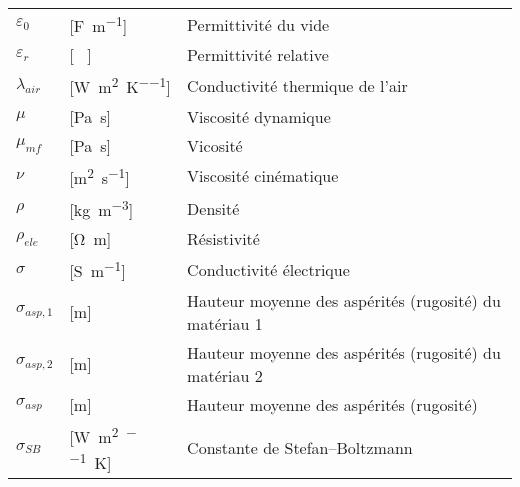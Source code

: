 \begin{longtable}{l p{2.5cm} p{4in}}
	$\varepsilon_0$   & [\si{\farad\per\metre}]                             & Permittivité du vide                                                                  \\
	$\varepsilon_r$   & [ \ ]                                               & Permittivité relative                                                                 \\
	$\lambda_{air}$   & [\si{\watt\per\square\metre\per\kelvin}]            & Conductivité thermique de l'air                                                       \\
	$\mu$             & [\si{\pascal\second}]                               & Viscosité dynamique                                                                   \\
	$\mu_{mf}$        & [\si{\pascal\second}]                               & Vicosité                                                                              \\
	$\nu$             & [\si{\square\metre\per\second}]                     & Viscosité cinématique                                                                 \\
	$\rho$            & [\si{\kilogram\per\cubic\metre}]                    & Densité                                                                               \\
	$\rho_{ele}$      & [\si{\ohm\metre}]                                   & Résistivité                                                                           \\
	$\sigma$          & [\si{\siemens\per\metre}]                           & Conductivité électrique                                                               \\
	$\sigma_{asp,1}$  & [\si{\metre}]                                       & Hauteur moyenne des aspérités (rugosité) du matériau 1                                \\
	$\sigma_{asp,2}$  & [\si{\metre}]                                       & Hauteur moyenne des aspérités (rugosité) du matériau 2                                \\
	$\sigma_{asp}$    & [\si{\metre}]                                       & Hauteur moyenne des aspérités (rugosité)                                              \\
	$\sigma_{SB}$     & [\si{\watt\per\square\metre\per\raiseto{4}\kelvin}] & Constante de Stefan–Boltzmann                                                         \\

\end{longtable}
